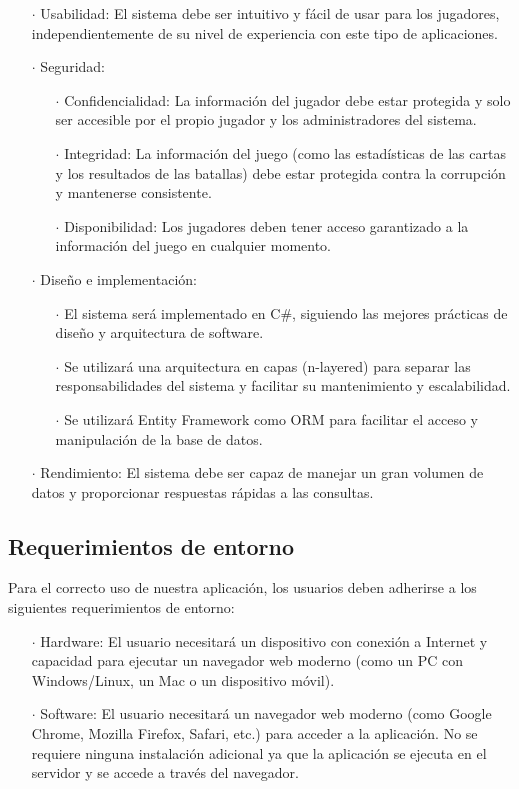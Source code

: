 \begin{enumerate}
  \item[\(\cdot\)] Usabilidad: El sistema debe ser intuitivo y fácil de usar para los jugadores, independientemente de su nivel de experiencia con este tipo de aplicaciones.
  \item[\(\cdot\)] Seguridad:
    \begin{enumerate}
      \item[\(\cdot\)] Confidencialidad: La información del jugador debe estar protegida y solo ser accesible por el propio jugador y los administradores del sistema.
      \item[\(\cdot\)] Integridad: La información del juego (como las estadísticas de las cartas y los resultados de las batallas) debe estar protegida contra la corrupción y mantenerse consistente.
      \item[\(\cdot\)] Disponibilidad: Los jugadores deben tener acceso garantizado a la información del juego en cualquier momento.
    \end{enumerate}
  \item[\(\cdot\)] Diseño e implementación:
    \begin{enumerate}
      \item[\(\cdot\)] El sistema será implementado en C\#, siguiendo las mejores prácticas de diseño y arquitectura de software.
      \item[\(\cdot\)] Se utilizará una arquitectura en capas (n-layered) para separar las responsabilidades del sistema y facilitar su mantenimiento y escalabilidad.
      \item[\(\cdot\)] Se utilizará Entity Framework como ORM para facilitar el acceso y manipulación de la base de datos.
    \end{enumerate}
  \item[\(\cdot\)] Rendimiento: El sistema debe ser capaz de manejar un gran volumen de datos y proporcionar respuestas rápidas a las consultas.
\end{enumerate}

\subsection{Requerimientos de entorno}

Para el correcto uso de nuestra aplicación, los usuarios deben adherirse a los siguientes requerimientos de entorno:

\begin{enumerate}
  \item[\(\cdot\)] Hardware: El usuario necesitará un dispositivo con conexión a Internet y capacidad para ejecutar un navegador web moderno (como un PC con Windows/Linux, un Mac o un dispositivo móvil).
  \item[\(\cdot\)] Software: El usuario necesitará un navegador web moderno (como Google Chrome, Mozilla Firefox, Safari, etc.) para acceder a la aplicación. No se requiere ninguna instalación adicional ya que la aplicación se ejecuta en el servidor y se accede a través del navegador.
\end{enumerate}

